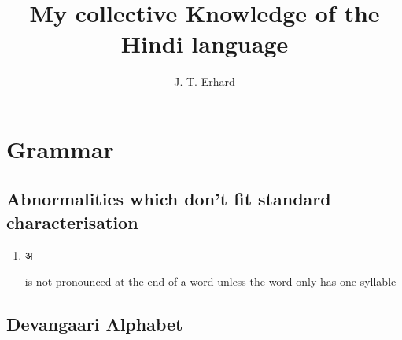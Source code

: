 \documentclass[12pt]{scrartcl}
\title{My collective Knowledge of the Hindi language}
\author{J. T. Erhard}
\date{}
\begin{document}
\maketitle
\clearpage
\tableofcontents
\clearpage 




\section{Grammar}
\subsection{Abnormalities which don't fit standard characterisation}

\begin{enumerate}
    \item \begin{hindi} अ \end{hindi} is not pronounced at the end of a word unless the word only has one syllable
\end{enumerate}

\subsection{Devangaari Alphabet}
\end{document}
